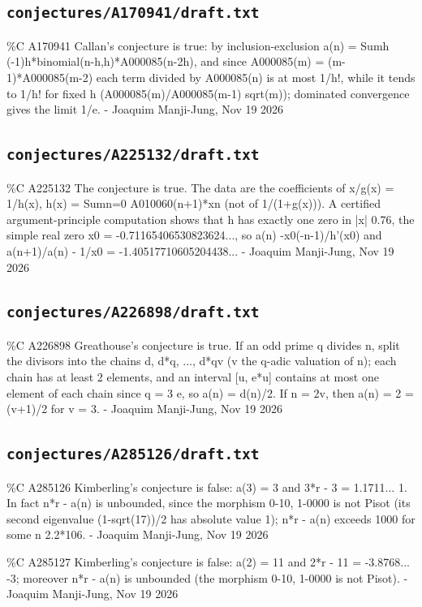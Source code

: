 \subsection*{\texttt{conjectures/A170941/draft.txt}}
{\small\raggedright\ttfamily
\%C A170941 Callan's conjecture is true: by inclusion-exclusion a(n) = Sumh (-1)h*binomial(n-h,h)*A000085(n-2h), and since A000085(m) = (m-1)*A000085(m-2) each term divided by A000085(n) is at most 1/h!, while it tends to 1/h! for fixed h (A000085(m)/A000085(m-1)  sqrt(m)); dominated convergence gives the limit 1/e. - Joaquim Manji-Jung, Nov 19 2026\par
}
\subsection*{\texttt{conjectures/A225132/draft.txt}}
{\small\raggedright\ttfamily
\%C A225132 The conjecture is true. The data are the coefficients of x/g(x) = 1/h(x), h(x) = Sumn=0 A010060(n+1)*xn (not of 1/(1+g(x))). A certified argument-principle computation shows that h has exactly one zero in |x|  0.76, the simple real zero x0 = -0.71165406530823624..., so a(n)  -x0(-n-1)/h'(x0) and a(n+1)/a(n) - 1/x0 = -1.40517710605204438... - Joaquim Manji-Jung, Nov 19 2026\par
}
\subsection*{\texttt{conjectures/A226898/draft.txt}}
{\small\raggedright\ttfamily
\%C A226898 Greathouse's conjecture is true. If an odd prime q divides n, split the divisors into the chains d, d*q, ..., d*qv (v the q-adic valuation of n); each chain has at least 2 elements, and an interval [u, e*u] contains at most one element of each chain since q = 3  e, so a(n) = d(n)/2. If n = 2v, then a(n) = 2 = (v+1)/2 for v = 3. - Joaquim Manji-Jung, Nov 19 2026\par
}
\subsection*{\texttt{conjectures/A285126/draft.txt}}
{\small\raggedright\ttfamily
\%C A285126 Kimberling's conjecture is false: a(3) = 3 and 3*r - 3 = 1.1711...  1. In fact n*r - a(n) is unbounded, since the morphism 0-10, 1-0000 is not Pisot (its second eigenvalue (1-sqrt(17))/2 has absolute value  1); n*r - a(n) exceeds 1000 for some n  2.2*106. - Joaquim Manji-Jung, Nov 19 2026\par
\%C A285127 Kimberling's conjecture is false: a(2) = 11 and 2*r - 11 = -3.8768...  -3; moreover n*r - a(n) is unbounded (the morphism 0-10, 1-0000 is not Pisot). - Joaquim Manji-Jung, Nov 19 2026\par
}
